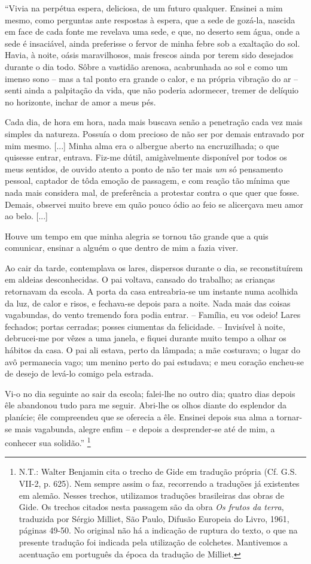 ``Vivia na perpétua espera, deliciosa, de um futuro qualquer. Ensinei a
mim mesmo, como perguntas ante respostas à espera, que a sede de
gozá-la, nascida em face de cada fonte me revelava uma sede, e que, no
deserto sem água, onde a sede é insaciável, ainda preferisse o fervor de
minha febre sob a exaltação do sol. Havia, à noite, oásis maravilhosos,
mais frescos ainda por terem sido desejados durante o dia todo. Sôbre a
vastidão arenosa, acabrunhada ao sol e como um imenso sono -- mas a tal
ponto era grande o calor, e na própria vibração do ar -- senti ainda a
palpitação da vida, que não poderia adormecer, tremer de delíquio no
horizonte, inchar de amor a meus pés.

Cada dia, de hora em hora, nada mais buscava senão a penetração cada vez
mais simples da natureza. Possuía o dom precioso de não ser por demais
entravado por mim mesmo. {[}...{]} Minha alma era o albergue aberto na
encruzilhada; o que quisesse entrar, entrava. Fiz-me dútil,
amigàvelmente disponível por todos os meus sentidos, de ouvido atento a
ponto de não ter mais \emph{um} só pensamento pessoal, captador de tôda
emoção de passagem, e com reação tão mínima que nada mais considera mal,
de preferência a protestar contra o que quer que fosse. Demais, observei
muito breve em quão pouco ódio ao feio se alicerçava meu amor ao belo.
{[}...{]}

Houve um tempo em que minha alegria se tornou tão grande que a quis
comunicar, ensinar a alguém o que dentro de mim a fazia viver.

Ao cair da tarde, contemplava os lares, dispersos durante o dia, se
reconstituírem em aldeias desconhecidas. O pai voltava, cansado do
trabalho; as crianças retornavam da escola. A porta da casa
entreabria-se um instante numa acolhida da luz, de calor e risos, e
fechava-se depois para a noite. Nada mais das coisas vagabundas, do
vento tremendo fora podia entrar. -- Família, eu vos odeio! Lares
fechados; portas cerradas; posses ciumentas da felicidade. -- Invisível
à noite, debrucei-me por vêzes a uma janela, e fiquei durante muito
tempo a olhar os hábitos da casa. O pai ali estava, perto da lâmpada; a
mãe costurava; o lugar do avô permanecia vago; um menino perto do pai
estudava; e meu coração encheu-se de desejo de levá-lo comigo pela
estrada.

Vi-o no dia seguinte ao sair da escola; falei-lhe no outro dia; quatro
dias depois êle abandonou tudo para me seguir. Abri-lhe os olhos diante
do esplendor da planície; êle compreendeu que se oferecia a êle. Ensinei
depois sua alma a tornar-se mais vagabunda, alegre enfim -- e depois a
desprender-se até de mim, a conhecer sua solidão.'' \footnote{N.T.:
  Walter Benjamin cita o trecho de Gide em tradução própria (Cf. G.S.
  VII-2, p. 625). Nem sempre assim o faz, recorrendo a traduções já
  existentes em alemão. Nesses trechos, utilizamos traduções brasileiras
  das obras de Gide. Os trechos citados nesta passagem são da obra
  \emph{Os frutos da terra}, traduzida por Sérgio Milliet, São Paulo,
  Difusão Europeia do Livro, 1961, páginas 49-50. No original não há a
  indicação de ruptura do texto, o que na presente tradução foi indicada
  pela utilização de colchetes. Mantivemos a acentuação em português da
  época da tradução de Milliet.}

